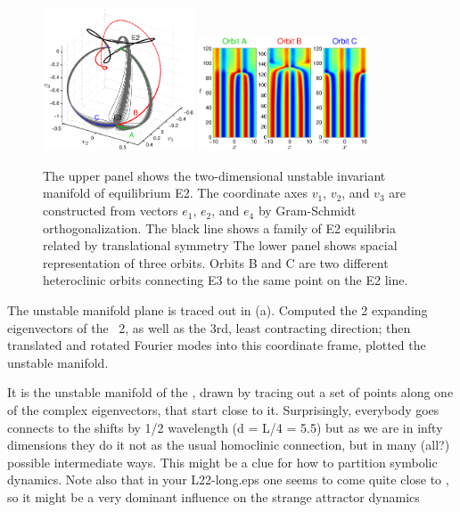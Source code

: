 \begin{figure}[h]\vspace*{-5pt} \centering
\includegraphics[width=0.4\textwidth]{figs/ks22_E3_manifold.eps}
\includegraphics[width=0.45\textwidth]{figs/ks22_E3_orbits.eps}
\vspace*{-5pt}\caption{ {\small The upper panel shows the two-dimensional
unstable invariant manifold of equilibrium E2. The coordinate axes
$v_1$, $v_2$, and $v_3$ are constructed from vectors
$e_1$, $e_2$, and $e_4$ by Gram-Schmidt orthogonalization.
The black line shows a family of E2 equilibria related by translational
symmetry The lower panel shows spacial representation of
three orbits. Orbits B and C are two different heteroclinic orbits
connecting E3 to the same point on the E2 line.}}
\label{f:KS22E3man}\vspace*{-5pt}
\end{figure}



The unstable manifold plane is traced out in
(a). Computed the 2 expanding eigenvectors
of the \eqv\ {\nameit}2, as well as the 3rd, least contracting
direction; then translated and rotated Fourier modes into this
coordinate frame, plotted the unstable manifold.


 It is the unstable manifold of the 
{\eqv}, drawn by tracing out a set of points along one of the complex
eigenvectors, that start close to it. Surprisingly, everybody goes connects
to the  shifts by 1/2 wavelength (d = L/4 = 5.5) but as we are in
infty dimensions they do it not as the usual homoclinic connection, but in
many (all?) possible intermediate ways. This might be a clue for how to
partition symbolic dynamics. Note also that in your L22-long.eps one seems
to come quite close to  {\eqv}, so it might be a very dominant
influence on the strange attractor dynamics


